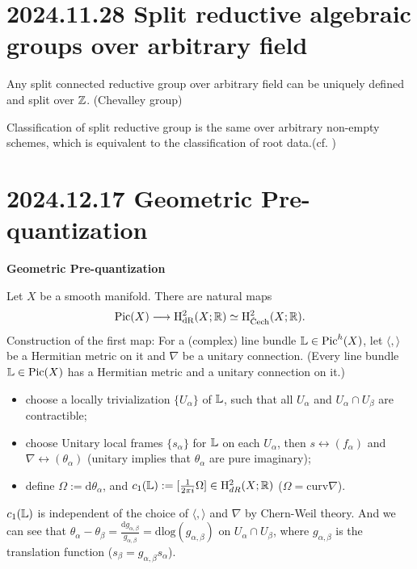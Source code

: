 \documentclass[12pt]{amsart}
\numberwithin{equation}{section}
\begin{document}
\section{2024.11.28 Split reductive algebraic groups over arbitrary field}
Any split connected reductive group over arbitrary field can be uniquely defined and split over ${\mathbb {Z}}$. (Chevalley group)

Classification of split reductive group is the same over arbitrary non-empty schemes, which is equivalent to the classification of root data.(cf. \cite{SGA3})




\section{2024.12.17 Geometric Pre-quantization}

\textbf{Geometric Pre-quantization}

Let $X$ be a smooth manifold. There are natural maps
\[
    \mathrm{Pic}(X) \longrightarrow  \mathrm{H}^{2}_{\text{dR}}(X;\BR) \simeq  \mathrm{H}^{2}_{\text{\v{C}ech}}(X;\BR).
\]
Construction of the first map:
For a (complex) line bundle ${\mathbb {L}} \in \mathrm{Pic}^{h}(X)$, let $\langle , \rangle$ be a Hermitian metric on it and $\nabla$ be a unitary connection. (Every line bundle ${\mathbb {L}} \in \mathrm{Pic}(X)$ has a Hermitian metric and a unitary connection on it.) 
\begin{itemize}
  \item choose a locally trivialization $\{U_{\alpha}\}$ of ${\mathbb {L}}$, such that all $U_{\alpha}$ and $U_{\alpha} \cap U_{\beta}$ are contractible;
  \item choose Unitary local frames $\{s_{\alpha}\}$ for ${\mathbb {L}}$ on each $U_{\alpha}$, then $s \leftrightarrow (f_\alpha)$ and $\nabla \leftrightarrow (\theta_\alpha)$ (unitary implies that $\theta_\alpha$ are pure imaginary);
  \item define $\Omega := \mathrm{d}\theta_\alpha$, and $c_1({\mathbb {L}}) := [\frac{1}{2\pi i}\Omega] \in \mathrm{H}^{2}_{dR}(X;{\mathbb {R}})$ ($\Omega = \mathrm{curv}\nabla$).
\end{itemize}
$c_1({\mathbb {L}})$ is independent of the choice of $\langle,\rangle$ and $\nabla$ by Chern-Weil theory.
And we can see that $\theta_\alpha - \theta_\beta = \frac{\mathrm{d}g_{\alpha,\beta}}{g_{\alpha,\beta}} = \mathrm{d}\mathrm{log}(g_{\alpha,\beta})$ on $U_\alpha \cap U_\beta$, where $g_{\alpha,\beta}$ is the translation function ($s_\beta = g_{\alpha,\beta}s_\alpha$).
\end{document}
